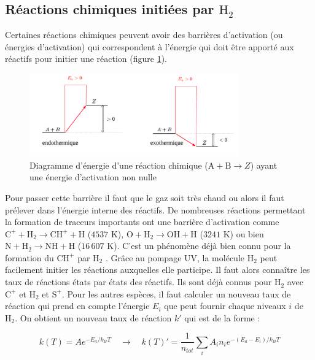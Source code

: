 \subsection{Réactions chimiques initiées par $\mathrm{H}_2$}

Certaines réactions chimiques peuvent avoir des barrières d'activation (ou énergies d'activation) qui correspondent à l'énergie qui doit être apporté aux réactifs pour initier une réaction (figure \ref{fig:H2:Ea}). 


\begin{figure}[!h]
    \centering
    \includegraphics[trim = {0 0 0 0cm },clip,width=0.8\textwidth]{figure/type46/Ea.pdf}
    \caption{Diagramme d'énergie d'une réaction chimique ($\mathrm{A}+\mathrm{B}\rightarrow Z$) ayant une énergie d'activation non nulle}
    \label{fig:H2:Ea}
\end{figure}


Pour passer cette barrière il faut que le gaz soit très chaud ou alors il faut prélever dans l'énergie interne des réactifs. De nombreuses réactions permettant la formation de traceurs importants ont une barrière d'activation comme $\mathrm{C}^+ + \mathrm{H}_2 \rightarrow \mathrm{CH}^+ + \mathrm{H}$ ($4537$ K),  $\mathrm{O} + \mathrm{H}_2 \rightarrow \mathrm{OH} + \mathrm{H}$  ($3241$ K) ou bien $\mathrm{N} + \mathrm{H}_2 \rightarrow \mathrm{NH} + \mathrm{H}$ ($16\,607$ K). C'est un phénomène déjà bien connu pour la formation du $\mathrm{CH}^+$ par $\mathrm{H}_2$ \cite{Herraez, Zanchet}. Grâce au pompage UV, la molécule $\mathrm{H}_2$ peut facilement initier les réactions auxquelles elle participe. Il faut alors connaître les taux de réactions états par états des réactifs. Ils sont déjà connus pour $\mathrm{H}_2$ avec $\mathrm{C}^+$ et $\mathrm{H}_2$ et $\mathrm{S}^+$. Pour les autres espèces, il faut calculer un nouveau taux de réaction qui prend en compte l'énergie $E_i$ que peut fournir chaque niveaux $i$ de $\mathrm{H}_2$. On obtient un nouveau taux de réaction $k'$ qui est de la forme :

\begin{equation}
    k(T) = A e^{- E_a / k_BT} \quad \rightarrow \quad  k(T)' =  \frac{1}{n_{tot}} \sum_i A_i n_i e^{- (E_a - E_i) / k_BT}
\end{equation}

